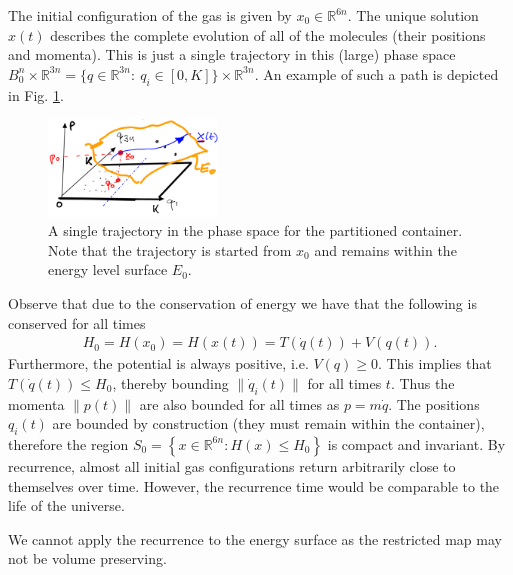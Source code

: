 \begin{ex}
The initial configuration of the gas is given by $x_0\in \mathbb{R}^{6n}$. The unique solution $x(t)$ describes the complete evolution of all of the molecules (their positions and momenta). This is just a single trajectory in this (large) phase space $B_0^{n}\times \mathbb{R}^{3n} = \{q \in \mathbb{R}^{3n}:\ q_i \in [0,K]\} \times \mathbb{R}^{3n}$. An example of such a path is depicted in Fig. \ref{fig:partitioned_gas_path}.
\begin{figure}[h!]
	\centering
	\includegraphics[width=0.4\textwidth]{figures/ch8/15partitioned_container_path.png}
	\caption{A single trajectory in the phase space for the partitioned container. Note that the trajectory is started from $x_0$ and remains within the energy level surface $E_0$.}
	\label{fig:partitioned_gas_path}
\end{figure}
Observe that due to the conservation of energy we have that the following is conserved for all times
\begin{align}
	H_0 = H(x_0) = H(x(t)) = T(\dot{q}(t)) + V(q(t)).
\end{align}
Furthermore, the potential is always positive, i.e. $V(q) \geq 0$. This implies that $T(\dot{q}(t)) \leq H_0$, thereby bounding $\|\dot{q}_i(t)\|$ for all times $t$. Thus the momenta $\|p(t)\|$ are also bounded for all times as $p = m\dot{q}$. The positions $q_i(t)$ are bounded by construction (they must remain within the container), therefore the region $S_0= \left\{ x \in \mathbb{R}^{6n}: H(x) \leq H_0 \right\}$ is compact and invariant. By recurrence, almost all initial gas configurations return arbitrarily close to themselves over time. However, the recurrence time would be comparable to the life of the universe. 
\begin{remark}[]
	We cannot apply the recurrence to the energy surface as the restricted map may not be volume preserving.
\end{remark}
\end{ex}

